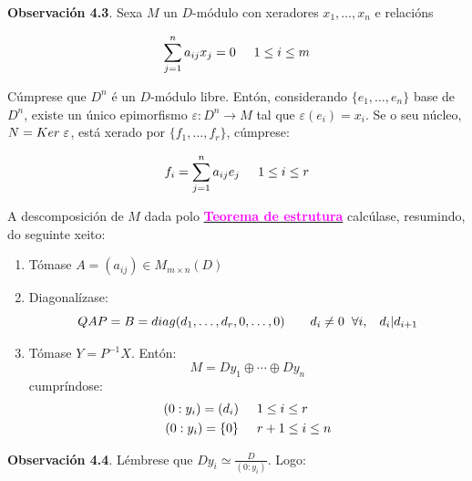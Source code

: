 \documentclass[twoside]{report}
\newcommand{\magbf}[1]{\textcolor{magenta}{\textbf{#1}}} %
\theoremstyle{mystyle}
\begin{document}
\vspace{3mm}

\noindent \textbf{Observación 4.3}. Sexa $M$ un $D$-módulo con xeradores $x_{1}, \dots, x_{n}$ e relacións

$$\displaystyle \sum_{j = 1}^{n}a_{ij}x_{j} = 0 \hspace{5mm} 1 \leq i \leq m$$

\vspace{3mm}

\noindent Cúmprese que $D^{n}$ é un $D$-módulo libre. Entón, considerando $\{e_{1}, \dots, e_{n}\}$ base de $D^{n}$, existe un único epimorfismo $\varepsilon: D^{n} \longrightarrow M$ tal que $\varepsilon(e_{i}) = x_{i}$. Se o seu núcleo, $N = Ker \hspace{1mm} \varepsilon$, está xerado por $\{f_{1}, \dots, f_{r}\}$, cúmprese:

$$f_{i} = \displaystyle \sum_{j = 1}^{n}a_{ij}e_{j} \hspace{5mm} 1 \leq i \leq r$$

\begin{mdframed}[linecolor = classicrose, linewidth = 1mm]
\noindent A descomposición de $M$ dada polo \hyperref[th4.2]{\magbf{Teorema de estrutura}} calcúlase, resumindo, do seguinte xeito:
\begin{enumerate}
    \item Tómase $A = (a_{ij}) \in M_{m \times n}(D)$
    \item Diagonalízase:
    $$QAP = B = diag(d_{1}, \dots, d_{r}, 0, \dots, 0) \hspace{7mm} d_{i} \neq 0 \hspace{2mm} \forall i, \hspace{3mm} d_{i} | d_{i+1}$$
    \item Tómase $Y = P^{-1}X$. Entón:
    $$M = Dy_{1} \oplus \cdots \oplus Dy_{n}$$
    cumpríndose:
    $$
    \begin{aligned}
        (0 : y_{i}) = (d_{i}) & \hspace{5mm} 1 \leq i \leq r\\
        (0 : y_{i}) = \{0\} & \hspace{5mm} r+1 \leq i \leq n
    \end{aligned}
    $$
\end{enumerate}
\end{mdframed}

\vspace{3mm}

\noindent \textbf{Observación 4.4}. Lémbrese que $Dy_{i} \simeq \displaystyle \frac{D}{(0 : y_{i})}$. Logo:\\
\end{document}
